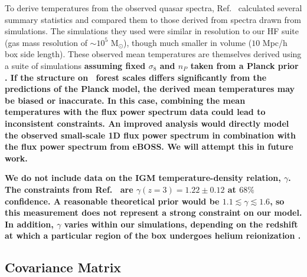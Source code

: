 To derive temperatures from the observed quasar spectra, Ref.~\cite{2021MNRAS.506.4389G} calculated several summary statistics and compared them to those derived from spectra drawn from simulations.
The simulations they used were similar in resolution to our HF suite (gas mass resolution of $\sim10^5$ M$_{\odot}$), though much smaller in volume ($10$ Mpc/h box side length).
These observed mean temperatures are themselves derived using a suite of simulations \textbf{assuming fixed $\sigma_8$ and $n_P$ taken from a Planck prior \cite{2021MNRAS.506.4389G}. If the structure on \Lya~forest scales differs significantly from the predictions of the Planck model, the derived mean temperatures may be biased or inaccurate. In this case, combining the mean temperatures with the flux power spectrum data could lead to inconsistent constraints. An improved analysis would directly model the observed small-scale 1D flux power spectrum in combination with the flux power spectrum from eBOSS. We will attempt this in future work.}

\textbf{We do not include data on the IGM temperature-density relation, $\gamma$. The constraints from Ref.~\cite{2021MNRAS.506.4389G} are $\gamma(z=3) = 1.22 \pm 0.12$ at $68\%$ confidence. A reasonable theoretical prior would be $1.1 \lesssim \gamma \lesssim 1.6$, so this measurement does not represent a strong constraint on our model. In addition, $\gamma$ varies within our simulations, depending on the redshift at which a particular region of the box undergoes helium reionization \cite{2020MNRAS.496.4372U}.}


\subsection{Covariance Matrix}
\label{sec:theoryerror}

